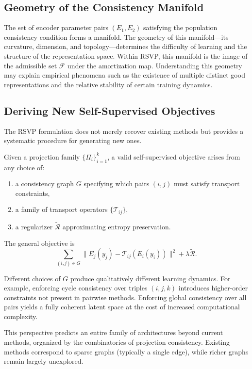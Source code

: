 \documentclass[12pt, oneside]{article}
\begin{document}
\subsection{Geometry of the Consistency Manifold}

The set of encoder parameter pairs $(E_1, E_2)$ satisfying the population consistency condition forms a manifold. The geometry of this manifold---its curvature, dimension, and topology---determines the difficulty of learning and the structure of the representation space. Within RSVP, this manifold is the image of the admissible set $\mathcal{F}$ under the amortization map. Understanding this geometry may explain empirical phenomena such as the existence of multiple distinct good representations and the relative stability of certain training dynamics.

\subsection{Deriving New Self-Supervised Objectives}

The RSVP formulation does not merely recover existing methods but provides a systematic procedure for generating new ones.

Given a projection family $\{\Pi_i\}_{i=1}^k$, a valid self-supervised objective arises from any choice of:
\begin{enumerate}[label=(\roman*)]
\item a consistency graph $G$ specifying which pairs $(i,j)$ must satisfy transport constraints,
\item a family of transport operators $\{\mathcal{T}_{ij}\}$,
\item a regularizer $\widetilde{\mathcal{R}}$ approximating entropy preservation.
\end{enumerate}

The general objective is
\[
\sum_{(i,j) \in G} \| E_j(y_j) - \mathcal{T}_{ij}(E_i(y_i)) \|^2
+ \lambda \widetilde{\mathcal{R}}.
\]

Different choices of $G$ produce qualitatively different learning dynamics. For example, enforcing cycle consistency over triples $(i,j,k)$ introduces higher-order constraints not present in pairwise methods. Enforcing global consistency over all pairs yields a fully coherent latent space at the cost of increased computational complexity.

This perspective predicts an entire family of architectures beyond current methods, organized by the combinatorics of projection consistency. Existing methods correspond to sparse graphs (typically a single edge), while richer graphs remain largely unexplored.
\end{document}
